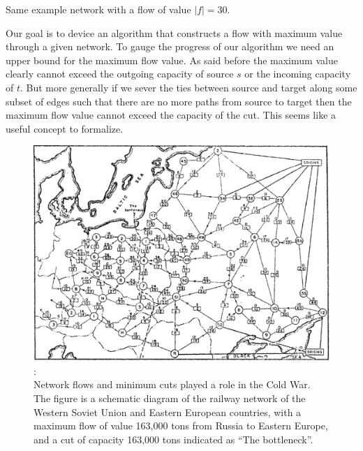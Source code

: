 \begin{marginfigure}
    \caption{Same example network with a flow of value $|f| = 30$.}
	\label{ex_flow_max}
\end{marginfigure}

Our goal is to device an algorithm that constructs a flow with maximum value through a given network. To gauge the progress of our algorithm we need an upper bound for the maximum flow value. As said before the maximum value clearly cannot exceed the outgoing capacity of source $s$ or the incoming capacity of $t$. But more generally if we sever the ties between source and target along some subset of edges such that there are no more paths from source to target then the maximum flow value cannot exceed the capacity of the cut. This seems like a useful concept to formalize.

\begin{figure}[t]
\includegraphics[scale=0.15]{soviettrainnetwork.jpeg}
\caption{\protect{}:\\
 Network flows and minimum cuts played a role in the Cold War. The figure is a schematic diagram of the railway network of the Western Soviet Union and Eastern European countries, with a maximum flow of value 163,000 tons from Russia to Eastern Europe, and a cut of capacity 163,000 tons indicated as “The bottleneck”.}
\end{figure}


